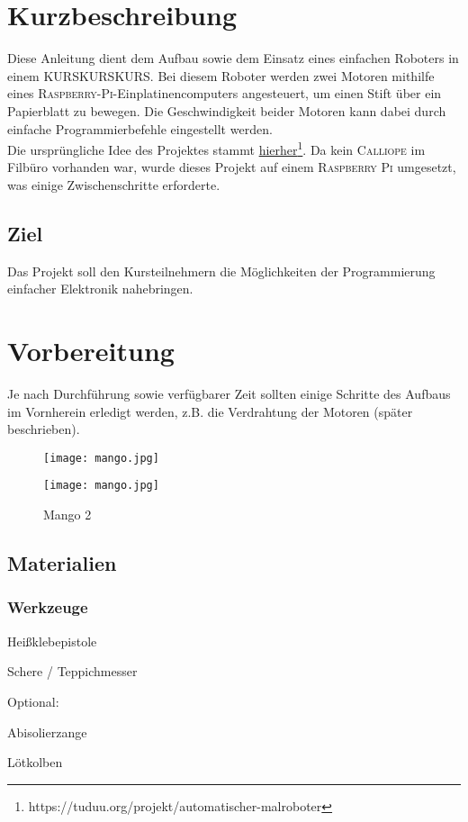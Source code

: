 \section{Kurzbeschreibung}
Diese Anleitung dient dem Aufbau sowie dem Einsatz eines einfachen Roboters in einem KURSKURSKURS. Bei diesem Roboter werden zwei Motoren mithilfe eines \textsc{Raspberry-Pi}-Einplatinencomputers angesteuert, um einen Stift über ein  Papierblatt zu bewegen. Die Geschwindigkeit beider Motoren kann dabei durch einfache Programmierbefehle eingestellt werden.\\

Die ursprüngliche Idee des Projektes stammt \href{https://tuduu.org/projekt/automatischer-malroboter}{hierher}\footnote[1]{https://tuduu.org/projekt/automatischer-malroboter}. Da kein \textsc{Calliope} im Filbüro vorhanden war, wurde dieses Projekt auf einem \textsc{Raspberry Pi} umgesetzt, was einige Zwischenschritte erforderte.\\

\subsection{Ziel}
Das Projekt soll den Kursteilnehmern die Möglichkeiten der Programmierung einfacher Elektronik nahebringen.

\section{Vorbereitung}
Je nach Durchführung sowie verfügbarer Zeit sollten einige Schritte des Aufbaus im Vornherein erledigt werden, z.B. die Verdrahtung der Motoren (später beschrieben).\\

\begin{figure}
\centering
\parbox{5cm}{
\texttt{[image: mango.jpg]}
\caption*{Mango 1}
}
\hfill
\begin{minipage}{5cm}
\texttt{[image: mango.jpg]}
\caption*{Mango 2}
\end{minipage}
\end{figure}

\subsection{Materialien}

\subsubsection{Werkzeuge}
\begin{checklist}
    \item Heißklebepistole
    \item Schere / Teppichmesser

    \begin{checklist}
    \item[] Optional:
    \item Abisolierzange
    \item Lötkolben
    \end{checklist}
\end{checklist}

